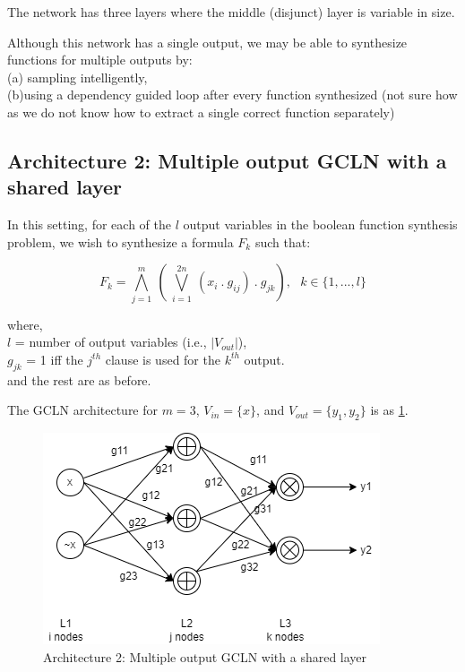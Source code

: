 The network has three layers where the middle (disjunct) layer is variable in size.

Although this network has a single output,  we may be able to synthesize functions for multiple outputs by:\\
(a) sampling intelligently,  \\
(b)using a dependency guided loop after every function synthesized (not sure how as we do not know how to extract a single correct function separately)

\subsection{Architecture 2: Multiple output GCLN with a shared layer}

In this setting, for each of the $l$ output variables in the boolean function synthesis problem, we wish to synthesize a formula $F_k$ such that:

\[ F_k = \bigwedge_{j = 1}^m \ (\  \bigvee_{i=1}^{2n}\  (x_i\ .\ g_{ij})\ .\ g_{jk}), \ \ \ k \in \{1, ..., l\}\]

where,  \\ 

$l$ = number of output variables (i.e.,  $|V_{out}|$), \\
$g_{jk}$ = 1 iff the $j^{th}$ clause is used for the $k^{th}$ output.\\
and the rest are as before.

The GCLN architecture for $m = 3$,  $V_{in} = \{ x\}$, and $V_{out} = \{ y_1, y_2\}$ is as \ref{fig:arch2}. \\

\begin{figure}[t]
	\centering
    \includegraphics[scale=0.5]{architecture-2.png}
    \caption{Architecture 2: Multiple output GCLN with a shared layer}
    \label{fig:arch2}
\end{figure}

